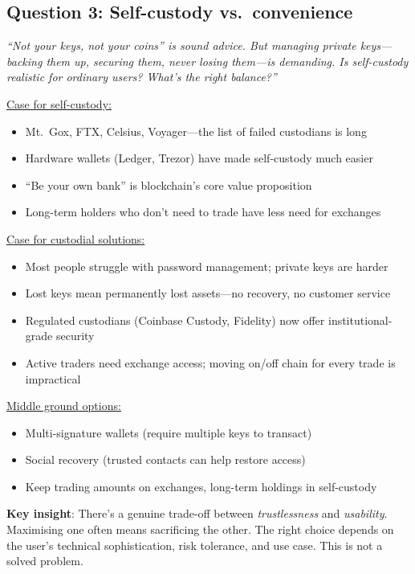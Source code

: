 \documentclass[11pt]{article}
\begin{document}
\subsection*{Question 3: Self-custody vs.\ convenience}

\textit{``Not your keys, not your coins'' is sound advice. But managing private keys---backing them up, securing them, never losing them---is demanding. Is self-custody realistic for ordinary users? What's the right balance?''}

\medskip
\noindent\underline{Case for self-custody:}
\begin{itemize}[leftmargin=*]
\item Mt.\ Gox, FTX, Celsius, Voyager---the list of failed custodians is long
\item Hardware wallets (Ledger, Trezor) have made self-custody much easier
\item ``Be your own bank'' is blockchain's core value proposition
\item Long-term holders who don't need to trade have less need for exchanges
\end{itemize}

\medskip
\noindent\underline{Case for custodial solutions:}
\begin{itemize}[leftmargin=*]
\item Most people struggle with password management; private keys are harder
\item Lost keys mean permanently lost assets---no recovery, no customer service
\item Regulated custodians (Coinbase Custody, Fidelity) now offer institutional-grade security
\item Active traders need exchange access; moving on/off chain for every trade is impractical
\end{itemize}

\medskip
\noindent\underline{Middle ground options:}
\begin{itemize}[leftmargin=*]
\item Multi-signature wallets (require multiple keys to transact)
\item Social recovery (trusted contacts can help restore access)
\item Keep trading amounts on exchanges, long-term holdings in self-custody
\end{itemize}

\medskip
\noindent\textbf{Key insight}: There's a genuine trade-off between \textit{trustlessness} and \textit{usability}. Maximising one often means sacrificing the other. The right choice depends on the user's technical sophistication, risk tolerance, and use case. This is not a solved problem.
\end{document}
